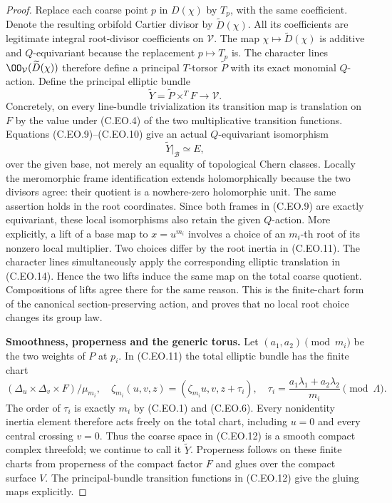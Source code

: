 \begin{proof}
Replace each coarse point $p$ in
$D(\chi)$ by $T_p$, with the same
coefficient. Denote the resulting
orbifold Cartier divisor by
$\widetilde D(\chi)$. All its
coefficients are legitimate integral
root-divisor coefficients on
$\mathcal V$. The map
$\chi\mapsto\widetilde D(\chi)$ is
additive and $Q$-equivariant because
the replacement $p\mapsto T_p$ is.
The character lines
$\OO_{\mathcal V}(\widetilde D(\chi))$
therefore define a principal $T$-torsor
$\widetilde P$ with its exact monomial
$Q$-action. Define the principal
elliptic bundle
\[
              \widetilde Y
                =\widetilde P\mathbin{\times^T}F
                     \longrightarrow\mathcal V .   \tag{C.EO.12}
\]
Concretely, on every line-bundle
trivialization its transition map is
translation on $F$ by the value under
(C.EO.4) of the two multiplicative
transition functions. Equations
(C.EO.9)--(C.EO.10) give an actual
$Q$-equivariant isomorphism
\[
                   \widetilde Y|_{\mathcal B}
                                   \simeq E,         \tag{C.EO.13}
\]
over the given base, not merely
an equality of topological Chern
classes. Locally the meromorphic
frame identification extends
holomorphically because the two
divisors agree: their quotient is
a nowhere-zero holomorphic unit.
The same assertion holds in the
root coordinates. Since both
frames in (C.EO.9) are exactly
equivariant, these local isomorphisms
also retain the given $Q$-action.
More explicitly, a lift of a base
map to $x=u^{m_i}$ involves a
choice of an $m_i$-th root of
its nonzero local multiplier.
Two choices differ by the
root inertia in (C.EO.11).
The character lines simultaneously
apply the corresponding elliptic
translation in (C.EO.14).
Hence the two lifts induce the
same map on the total coarse
quotient. Compositions of lifts
agree there for the same reason.
This is the finite-chart form
of the canonical section-preserving
action, and proves that no local
root choice changes its group law.

\par\medskip\noindent\textbf{Smoothness, properness and the generic torus.}
Let $(a_1,a_2)\pmod {m_i}$ be the
two weights of $P$ at $p_i$.
In (C.EO.11) the total elliptic
bundle has the finite chart
\[
 (\Delta_u\times\Delta_v\times F)/\mu_{m_i},
 \quad
 \zeta_{m_i}(u,v,z)
     =(\zeta_{m_i}u,v,z+\tau_i),\quad
 \tau_i=\frac{a_1\lambda_1+a_2\lambda_2}{m_i}
                                           \pmod\Lambda .
                                                               \tag{C.EO.14}
\]
The order of $\tau_i$ is exactly
$m_i$ by (C.EO.1) and (C.EO.6).
Every nonidentity inertia element
therefore acts freely on the total
chart, including $u=0$ and every
central crossing $v=0$. Thus the
coarse space in (C.EO.12) is a
smooth compact complex threefold;
we continue to call it
$\widetilde Y$. Properness follows
on these finite charts from
properness of the compact factor
$F$ and glues over the compact
surface $V$. The principal-bundle
transition functions in (C.EO.12)
give the gluing maps explicitly.


\end{proof}
